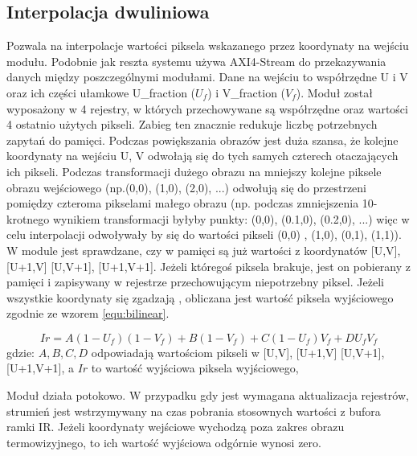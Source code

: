 \subsection{Interpolacja dwuliniowa} %
Pozwala na interpolacje wartości piksela wskazanego przez koordynaty na wejściu modułu.
Podobnie jak reszta systemu używa AXI4-Stream do przekazywania danych między poszczególnymi modułami. 
Dane na wejściu to współrzędne U i V oraz ich części ułamkowe U\_fraction ($U_f$) i V\_fraction ($V_f$). 
Moduł został wyposażony w 4 rejestry, w których przechowywane są współrzędne oraz wartości 4 ostatnio użytych pikseli. 
Zabieg ten znacznie redukuje liczbę potrzebnych zapytań do pamięci. 
Podczas powiększania obrazów jest duża szansa, że kolejne koordynaty na wejściu U, V odwołają się do tych samych czterech otaczających ich pikseli. Podczas transformacji dużego obrazu na mniejszy kolejne piksele obrazu wejściowego (np.(0,0), (1,0), (2,0), ...) odwołują się do przestrzeni pomiędzy czteroma pikselami małego obrazu (np. podczas zmniejszenia 10-krotnego wynikiem transformacji byłyby punkty: (0,0), (0.1,0), (0.2,0), ...) więc w celu interpolacji odwoływały by się do wartości pikseli (0,0) , (1,0), (0,1), (1,1)). 
W module jest sprawdzane, czy w pamięci są już wartości z koordynatów [U,V], [U+1,V] [U,V+1], [U+1,V+1]. 
Jeżeli któregoś piksela brakuje, jest on pobierany z pamięci i zapisywany w rejestrze przechowującym niepotrzebny piksel. 
Jeżeli wszystkie koordynaty się zgadzają , obliczana jest wartość piksela wyjściowego zgodnie ze wzorem \eqref{equ:bilinear}.  

\begin{equation}\label{equ:bilinear}
Ir = A(1-U_{f})(1-V_{f})+B(1-V_{f})+C(1- U_{f})V_{f}+ D U_{f} V_{f}
\end{equation}
\noindent gdzie: $ A, B, C ,D $ odpowiadają wartościom pikseli w [U,V], [U+1,V] [U,V+1], [U+1,V+1], a $ Ir $ to wartość wyjściowa piksela wyjściowego, %

Moduł działa potokowo. W przypadku gdy jest wymagana aktualizacja rejestrów, strumień jest wstrzymywany na czas pobrania stosownych wartości z bufora ramki IR. Jeżeli koordynaty wejściowe wychodzą poza zakres obrazu termowizyjnego, to ich wartość wyjściowa odgórnie wynosi zero.

